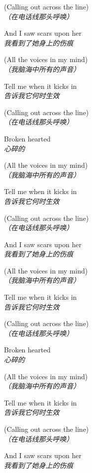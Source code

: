 \begin{spacing}{1.5}
\begin{flushleft}
(Calling out across the line)\\
\textit{（在电话线那头呼唤）}\lyricspace

And I saw scars upon her\\
\textit{我看到了她身上的伤痕}\lyricspace

(All the voices in my mind)\\
\textit{（我脑海中所有的声音）}\lyricspace

Tell me when it kicks in\\
\textit{告诉我它何时生效}\lyricspace

(Calling out across the line)\\
\textit{（在电话线那头呼唤）}\lyricspace

Broken hearted\\
\textit{心碎的}\lyricspace

(All the voices in my mind)\\
\textit{（我脑海中所有的声音）}\lyricspace

Tell me when it kicks in\\
\textit{告诉我它何时生效}\lyricspace

(Calling out across the line)\\
\textit{（在电话线那头呼唤）}\lyricspace

And I saw scars upon her\\
\textit{我看到了她身上的伤痕}\lyricspace

(All the voices in my mind)\\
\textit{（我脑海中所有的声音）}\lyricspace

Tell me when it kicks in\\
\textit{告诉我它何时生效}\lyricspace

(Calling out across the line)\\
\textit{（在电话线那头呼唤）}\lyricspace

Broken hearted\\
\textit{心碎的}\lyricspace

(All the voices in my mind)\\
\textit{（我脑海中所有的声音）}\lyricspace

Tell me when it kicks in\\
\textit{告诉我它何时生效}\lyricspace

(Calling out across the line)\\
\textit{（在电话线那头呼唤）}\lyricspace

And I saw scars upon her\\
\textit{我看到了她身上的伤痕}\lyricspace


\end{flushleft}
\end{spacing}
